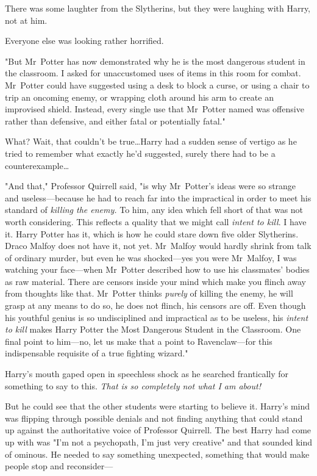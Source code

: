 There was some laughter from the Slytherins, but they were laughing with Harry,
not at him.

Everyone else was looking rather horrified.

"But Mr~Potter has now demonstrated why he is the most dangerous student in
the classroom. I asked for unaccustomed uses of items in this room for combat.
Mr~Potter could have suggested using a desk to block a curse, or using a chair
to trip an oncoming enemy, or wrapping cloth around his arm to create an
improvised shield. Instead, every single use that Mr~Potter named was
offensive rather than defensive, and either fatal or potentially fatal."

What? Wait, that couldn’t be true…Harry had a sudden sense of vertigo
as he tried to remember what exactly he’d suggested, surely there had to be a
counterexample…

"And that," Professor Quirrell said, "is why Mr~Potter’s ideas were so strange
and useless—because he had to reach far into the impractical in order to meet
his standard of \emph{killing the enemy.} To him, any idea which fell short of
that was not worth considering. This reflects a quality that we might call
\emph{intent to kill}. I have it. Harry Potter has it, which is how he could
stare down five older Slytherins. Draco Malfoy does not have it, not yet.
Mr~Malfoy would hardly shrink from talk of ordinary murder, but even he was
shocked—yes you were Mr~Malfoy, I was watching your face—when Mr~Potter
described how to use his classmates’ bodies as raw material. There are censors
inside your mind which make you flinch away from thoughts like that. Mr~Potter
thinks \emph{purely} of killing the enemy, he will grasp at any means to do so,
he does not flinch, his censors are off. Even though his youthful genius is so
undisciplined and impractical as to be useless, his \emph{intent to kill} makes
Harry Potter the Most Dangerous Student in the Classroom. One final point to
him—no, let us make that a point to Ravenclaw—for this indispensable
requisite of a true fighting wizard."

Harry’s mouth gaped open in speechless shock as he searched frantically for
something to say to this. \emph{That is so completely not what I am about!}

But he could see that the other students were starting to believe it. Harry’s
mind was flipping through possible denials and not finding anything that could
stand up against the authoritative voice of Professor Quirrell. The best Harry
had come up with was "I’m not a psychopath, I’m just very creative" and that
sounded kind of ominous. He needed to say something unexpected, something that
would make people stop and reconsider—

